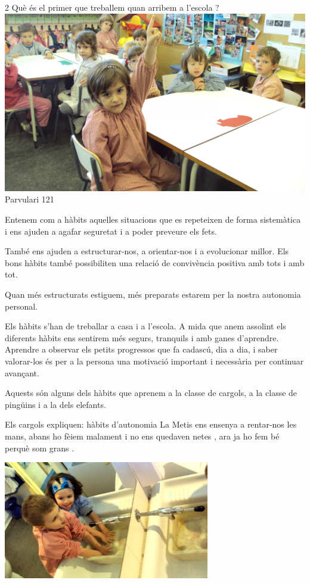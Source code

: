 \begin{news}
{2} %
{Què és el primer que treballem quan arribem a l’escola ?}
{\noindent\includegraphics[width=18cm,keepaspectratio]{parvulari/img/foto3b.jpg}}
{Parvulari}
{121} %

Entenem com a hàbits aquelles situacions que es repeteixen de forma sistemàtica i ens ajuden a agafar seguretat i a poder preveure els fets.

També ens ajuden a estructurar-nos, a orientar-nos i a evolucionar millor.
Els bons hàbits també possibiliten una relació de convivència positiva amb tots i amb tot.

Quan més estructurats estiguem, més preparats estarem per la nostra autonomia personal. 

Els hàbits s’han de treballar a casa i a l’escola. A mida que anem assolint els diferents hàbits ens sentirem més segurs, tranquils i amb ganes d’aprendre.
Aprendre a observar els petits progressos que fa cadascú, dia a dia,  i saber valorar-los és per a la persona  una motivació important i necessària per continuar avançant.

Aquests  són alguns dels hàbits que aprenem a la classe de cargols, a la classe de pingüins i a la dels elefants.

Els cargols expliquen: hàbits d’autonomia
La Metis ens ensenya a rentar-nos les mans, abans ho fèiem  malament i no ens quedaven netes , ara ja ho fem bé perquè som grans .


\noindent\includegraphics[width=9cm,keepaspectratio]{parvulari/img/foto1b.jpg}


\end{news}
